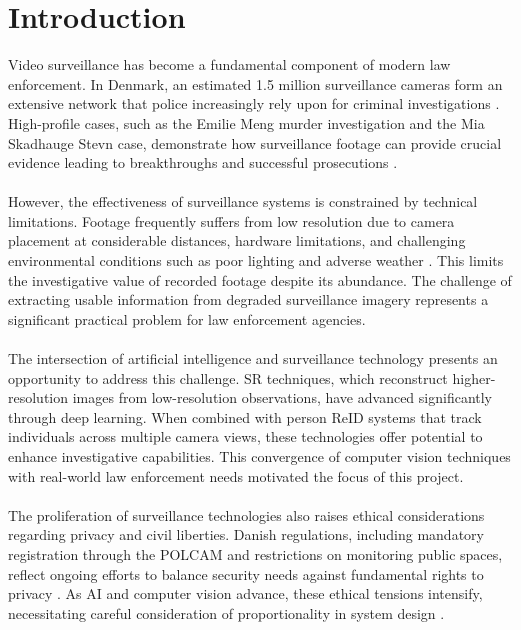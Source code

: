 \chapter{Introduction}
\label{cha:introduction}

Video surveillance has become a fundamental component of modern law enforcement. In Denmark, an estimated 1.5 million surveillance cameras form an extensive network that police increasingly rely upon for criminal investigations \cite{overvagningsekspert2025}. High-profile cases, such as the Emilie Meng murder investigation and the Mia Skadhauge Stevn case, demonstrate how surveillance footage can provide crucial evidence leading to breakthroughs and successful prosecutions \cite{emilie_meng_avisen, mia_stevn_avisen}.
\\\\
However, the effectiveness of surveillance systems is constrained by technical limitations. Footage frequently suffers from low resolution due to camera placement at considerable distances, hardware limitations, and challenging environmental conditions such as poor lighting and adverse weather \cite{arxiv_superres2021}. This limits the investigative value of recorded footage despite its abundance. The challenge of extracting usable information from degraded surveillance imagery represents a significant practical problem for law enforcement agencies.
\\\\
The intersection of artificial intelligence and surveillance technology presents an opportunity to address this challenge. \ac{SR} techniques, which reconstruct higher-resolution images from low-resolution observations, have advanced significantly through deep learning. When combined with person \ac{ReID} systems that track individuals across multiple camera views, these technologies offer potential to enhance investigative capabilities. This convergence of computer vision techniques with real-world law enforcement needs motivated the focus of this project.
\\\\
The proliferation of surveillance technologies also raises ethical considerations regarding privacy and civil liberties. Danish regulations, including mandatory registration through the \ac{POLCAM} and restrictions on monitoring public spaces, reflect ongoing efforts to balance security needs against fundamental rights to privacy \cite{politiet2024registrer, lov_tv_overvaagning2023}. As \ac{AI} and computer vision advance, these ethical tensions intensify, necessitating careful consideration of proportionality in system design \cite{overvagningsekspert2025, menneskeret_overvaagning}.
